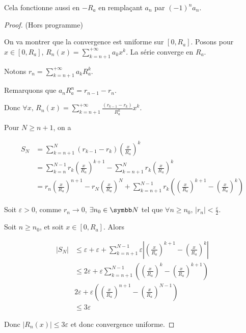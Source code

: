 \begin{remarque}
    Cela fonctionne aussi en $- R_a$ en remplaçant $a_n$ par $(-1)^n a_n$.
\end{remarque}

\begin{proof}
    (Hors programme)

    On va montrer que la convergence est uniforme sur $[0, R_a]$. Posons pour $x \in [0, R_a]$, 
    $\displaystyle R_n(x) = \sum_{k = n + 1}^{+\infty} a_k x^k$. La série converge en $R_a$. 

    Notons $\displaystyle r_n = \sum_{k = n + 1}^{+\infty} a_k R_a^k$. 

    Remarquons que $a_n R_a^n = r_{n - 1} - r_n$. 

    Donc $\displaystyle \forall x, \, R_n(x) = \sum_{k = n + 1}^{+\infty} \frac{(r_{k - 1} - r_k)}{R_a^k } x^k$. 
    
    Pour $N \geqslant n + 1$, on a

    \begin{align*}
        S_N & = \sum_{k = n + 1 }^{N } (r_{k - 1} - r_k) \left( \frac x {R_a} \right)^k \\
        & = \sum_{k = n }^{ N - 1 } r_k \left(\frac x {R_a} \right)^{k + 1} - \sum_{k = n + 1}^N r_k \left( \frac x {R_a} \right)^k \\
        & = r_n \left( \frac{x }{R_a} \right)^{n + 1} - r_N \left( \frac x {R_a} \right)^N + \sum_{k = n + 1}^{N - 1} r_k \left( \left( \frac x {R_a} \right)^{k + 1} - \left( \frac x {R_a} \right)^k \right)
    \end{align*}

    Soit $\varepsilon > 0$, comme $r_n \to 0$, $\exists n_0 \in \N$ tel que $\forall n \geqslant n_0, \, |r_n| < \frac{\varepsilon }{2 }$.

    Soit $n \geqslant n_0$, et soit $x \in [0, R_a]$.
    Alors 

    \begin{align*}
        |S_N| & \leqslant \varepsilon + \varepsilon + \sum_{k = n + 1}^{N - 1}  \varepsilon \left| \left( \frac x {R_a} \right)^{k +1} - \left( \frac{x}{R_a } \right)^{k} \right| \\
        & \leqslant 2 \varepsilon + \varepsilon \sum_{k = n + 1}^{N - 1} \left( \left( \frac x {R_a} \right)^k - \left( \frac x {R_a} \right)^{k + 1} \right) \\ 
        & 2 \varepsilon + \varepsilon \left( \left( \frac x {R_a} \right)^{n + 1} - \left( \frac x {R_a} \right)^{N - 1}\right) \\
        & \leqslant 3 \varepsilon
    \end{align*}

    Donc $|R_n(x)| \leqslant 3 \varepsilon$ et donc convergence uniforme. 
\end{proof}

